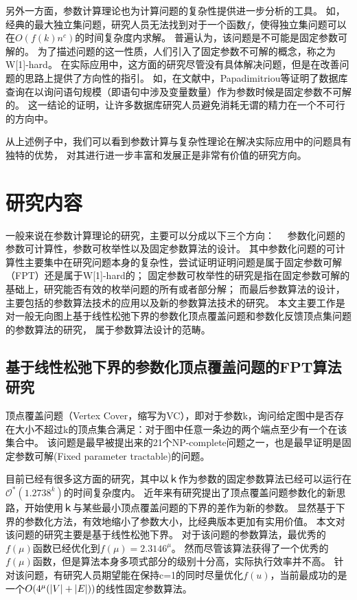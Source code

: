 另外一方面，参数计算理论也为计算问题的复杂性提供进一步分析的工具。
如，经典的最大独立集问题，研究人员无法找到对于一个函数$f$，使得独立集问题可以在$O(f(k)n^c)$的时间复杂度内求解。
普遍认为，该问题是不可能是固定参数可解的。
为了描述问题的这一性质，人们引入了固定参数不可解的概念，称之为W[1]-hard。
在实际应用中，这方面的研究尽管没有具体解决问题，但是在改善问题的思路上提供了方向性的指引。
如，在文献\cite{papadimitriou1997complexity}中，Papadimitriou等证明了数据库查询在以询问语句规模（即语句中涉及变量数量）作为参数时候是固定参数不可解的。
这一结论的证明，让许多数据库研究人员避免消耗无谓的精力在一个不可行的方向中。


从上述例子中，我们可以看到参数计算与复杂性理论在解决实际应用中的问题具有独特的优势，
对其进行进一步丰富和发展正是非常有价值的研究方向。



\section{研究内容}
一般来说在参数计算理论的研究，主要可以分成以下三个方向：　
参数化问题的参数可计算性，参数可枚举性以及固定参数算法的设计。
其中参数化问题的可计算性主要集中在研究问题本身的复杂性，尝试证明证明问题是属于固定参数可解（FPT）还是属于W[1]-hard的；
固定参数可枚举性的研究是指在固定参数可解的基础上，研究能否有效的枚举问题的所有或者部分解；
而最后参数算法的设计，主要包括的参数算法技术的应用以及新的参数算法技术的研究。
本文主要工作是对一般无向图上基于线性松弛下界的参数化顶点覆盖问题和参数化反馈顶点集问题的参数算法的研究，
属于参数算法设计的范畴。

\subsection{基于线性松弛下界的参数化顶点覆盖问题的FPT算法研究}
顶点覆盖问题（Vertex Cover，缩写为VC），即对于参数k，询问给定图中是否存在大小不超过k的顶点集合满足：对于图中任意一条边的两个端点至少有一个在该集合中。
该问题是最早被提出来的21个NP-complete问题之一，也是最早证明是固定参数可解(Fixed parameter tractable)的问题。

目前已经有很多这方面的研究，其中以ｋ作为参数的固定参数算法已经可以运行在$\mathcal{O}^*(1.2738^k)$的时间复杂度内。
近年来有研究提出了顶点覆盖问题参数化的新思路，开始使用ｋ与某些最小顶点覆盖问题的下界的差作为新的参数。
显然基于下界的参数化方法，有效地缩小了参数大小，比经典版本更加有实用价值。
本文对该问题的研究主要是基于线性松弛下界。
对于该问题的参数算法，最优秀的$f(\mu)$函数已经优化到$f(\mu) = 2.3146^\mu$。
然而尽管该算法获得了一个优秀的$f(\mu)$函数，但是算法本身多项式部分的级别十分高，实际执行效率并不高。
针对该问题，有研究人员期望能在保持c=1的同时尽量优化$f(u)$，当前最成功的是一个$O(4^{\mu}(\left\vert V \right\vert+\left\vert E \right\vert))$的线性固定参数算法。

